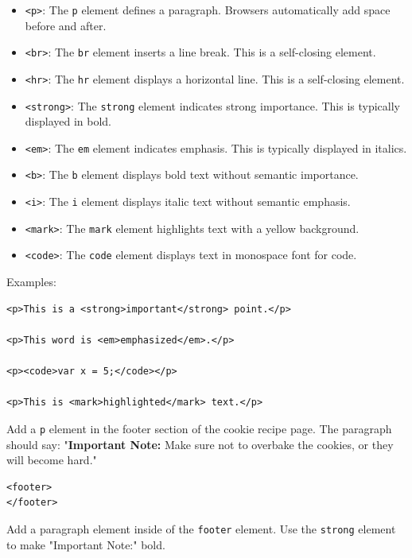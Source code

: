 \begin{itemize}
    \item \verb|<p>|: The \verb|p| element defines a paragraph. Browsers automatically add space before and after.
    \item \verb|<br>|: The \verb|br| element inserts a line break. This is a self-closing element.
    \item \verb|<hr>|: The \verb|hr| element displays a horizontal line. This is a self-closing element.
    \item \verb|<strong>|: The \verb|strong| element indicates strong importance. This is typically displayed in bold.
    \item \verb|<em>|: The \verb|em| element indicates emphasis. This is typically displayed in italics.
    \item \verb|<b>|: The \verb|b| element displays bold text without semantic importance.
    \item \verb|<i>|: The \verb|i| element displays italic text without semantic emphasis.
    \item \verb|<mark>|: The \verb|mark| element highlights text with a yellow background.
    \item \verb|<code>|: The \verb|code| element displays text in monospace font for code.
\end{itemize}

Examples:

\begin{verbatim}
<p>This is a <strong>important</strong> point.</p>

<p>This word is <em>emphasized</em>.</p>

<p><code>var x = 5;</code></p>

<p>This is <mark>highlighted</mark> text.</p>
\end{verbatim}

\begin{Exercise}[label=html-text1, title=Using Text Elements]

Add a \texttt{p} element in the footer section of the cookie recipe page. 
The paragraph should say: "\textbf{Important Note:} Make sure not to overbake the cookies, or they will become hard."

\begin{verbatim}
<footer>
</footer>
\end{verbatim}

Add a paragraph element inside of the \texttt{footer} element. Use the \texttt{strong} element to make "Important Note:" bold.
\end{Exercise}

